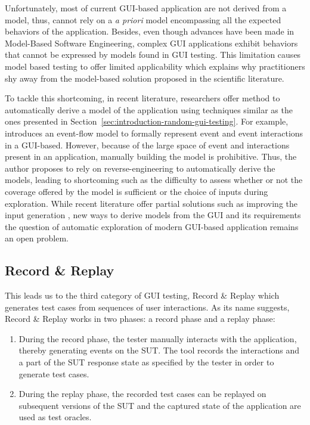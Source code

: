 Unfortunately, most of current GUI-based application are not derived from a model, thus, cannot rely on a \emph{a priori} model encompassing all the expected behaviors of the application. Besides, even though advances have been made in Model-Based Software Engineering, complex GUI applications exhibit behaviors that cannot be expressed by models found in GUI testing. This limitation causes model based testing to offer limited applicability which explains why practitioners shy away from the model-based solution proposed in the scientific literature.

To tackle this shortcoming, in recent literature, researchers offer method to automatically derive a model of the application using techniques similar as the ones presented in Section~\ref{sec:introduction-random-gui-testing}. For example, \textcite{Memon2007} introduces an event-flow model to formally represent event and event interactions in a GUI-based. However, because of the large space of event and interactions present in an application, manually building the model is prohibitive. Thus, the author proposes to rely on reverse-engineering to automatically derive the models, leading to shortcoming such as the difficulty to assess whether or not the coverage offered by the model is sufficient or the choice of inputs during exploration. While recent literature offer partial solutions such as improving the input generation \cite{Biagiola2019}, new ways to derive models from the GUI and its requirements \cite{Canny2020} the question of automatic exploration of modern GUI-based application remains an open problem.

\subsection{Record \& Replay}
\label{sec:introduction-record-and-replay}

This leads us to the third category of GUI testing, Record \& Replay which generates test cases from sequences of user interactions. As its name suggests, Record \& Replay works in two phases: a record phase and a replay phase:

\begin{enumerate}
    \item During the record phase, the tester manually interacts with the application, thereby generating events on the SUT. The tool records the interactions and a part of the SUT response state as specified by the tester in order to generate test cases.
    \item During the replay phase, the recorded test cases can be replayed on subsequent versions of the SUT and the captured state of the application are used as test oracles.
\end{enumerate}

